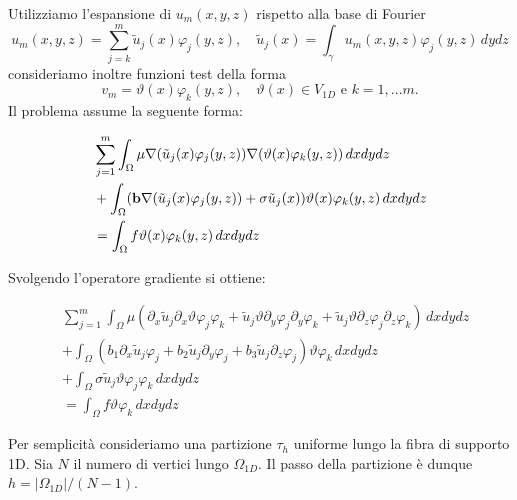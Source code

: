Utilizziamo l'espansione di $u_m(x,y,z)$ 
rispetto alla base di Fourier 
\begin{displaymath}
u_m(x,y,z)=\sum_{j=k}^m\tilde{u}_j(x)\varphi _j(y,z),\quad\tilde{u}_j(x)=\int_{\gamma}u_m(x,y,z) \varphi_j(y,z)\,dydz
\end{displaymath}
consideriamo inoltre funzioni test della forma 
$$v_m=\vartheta(x)\varphi _k(y,z),\quad \vartheta(x)\in V_{1D}\text{ e }
k=1,...m.$$ Il problema assume la seguente forma:

\begin{equation}
\begin{split}
&\sum_{j=1}^m 
\int_\Omega\mu\nabla (\tilde{u}_j(x)\varphi _j(y,z))\nabla (\vartheta(x)\varphi _k(y,z))\,dxdydz\\
&+\int_\Omega(\mathbf{b}\nabla (\tilde{u}_j(x)\varphi _j(y,z))+\sigma\tilde{u}_j(x))\vartheta(x)\varphi _k(y,z)\,dxdydz\\
&=\int_\Omega f\vartheta(x)\varphi _k(y,z)\,dxdydz\\
\end{split}
\end{equation}

Svolgendo l'operatore gradiente si ottiene:

\begin{equation}
\begin{split}
&\sum_{j=1}^m
\int_\Omega\mu( \partial_x\tilde{u}_j \partial_x\vartheta\varphi _j\varphi _k + \tilde{u}_j \vartheta \partial_y\varphi _j\partial_y\varphi _k + \tilde{u}_j \vartheta \partial_z\varphi _j\partial_z\varphi _k)\,dxdydz \\
&+ \int_\Omega (b_1\partial_x\tilde{u}_j\varphi _j+b_2\tilde{u}_j\partial_y\varphi _j + b_3\tilde{u}_j\partial_z\varphi_j)\vartheta\varphi _k\,dxdydz\\ 
&+ \int_\Omega \sigma\tilde{u}_j\vartheta\varphi _j\varphi _k\,dxdydz \\
&=\int_\Omega f\vartheta\varphi _k\,dxdydz
\end{split}
\end{equation}

Per semplicit\`a consideriamo una partizione $\tau_h$ uniforme lungo 
la fibra di supporto 1D.
Sia $N$ il numero di vertici lungo $\Omega_{1D}$.
Il passo della partizione \`e dunque $h=\vert \Omega_{1D}\vert / (N-1)$. 

